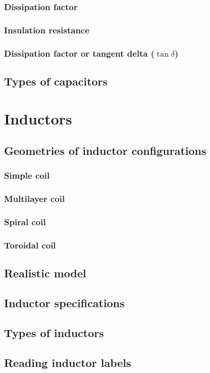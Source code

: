 \documentclass{report}
\begin{document}
\subsubsection{Dissipation factor}
\subsubsection{Insulation resistance}
\subsubsection{Dissipation factor or tangent delta ($\tan \delta$)}
\subsection{Types of capacitors}
\section{Inductors}
\subsection{Geometries of inductor configurations}
\subsubsection{Simple coil}
\subsubsection{Multilayer coil}
\subsubsection{Spiral coil}
\subsubsection{Toroidal coil}
\subsection{Realistic model}
\subsection{Inductor specifications}
\subsection{Types of inductors}
\subsection{Reading inductor labels}
\end{document}
